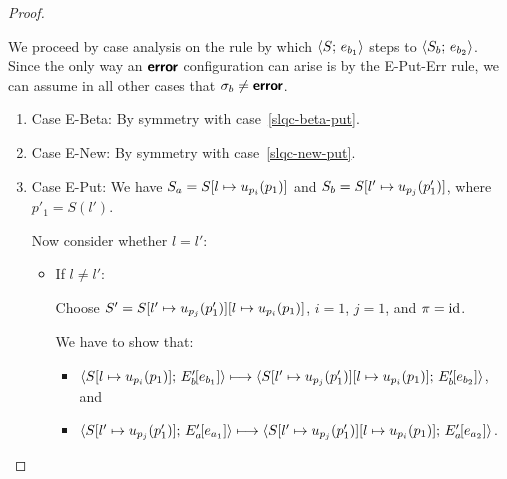 \begin{proof}
\begin{enumerate}
    We proceed by case analysis on the rule by which
    $\langle S;\, e_{b_1} \rangle$ steps to $\langle S_b;\, e_{b_2} \rangle$.  Since the
    only way an $\textbf{\textsf{error}}$ configuration can arise is by the {\sc
      E-Put-Err} rule, we can assume in all other cases that $\sigma_b
    \neq \textbf{\textsf{error}}$.
    \begin{enumerate}
    \item \label{slqc-put-beta}Case {\sc E-Beta}: By symmetry with case~\ref{slqc-beta-put}.
    \item \label{slqc-put-new}Case {\sc E-New}: By symmetry with case~\ref{slqc-new-put}.
    \item \label{slqc-put-put}Case {\sc E-Put}: We have $S_a =
      S[l \mapsto u_{p_i}(p_1)]$ and $S_b =
      S[l' \mapsto u_{p_j}(p'_1)]$, where $p'_1 = S(l')$.

      Now consider whether $l = l'$:
      \begin{itemize}
        \item If $l \neq l'$:

          Choose $S' =
          S[l' \mapsto u_{p_j}(p'_1)][l \mapsto u_{p_i}(p_1)]$,
          $i = 1$, $j = 1$, and $\pi = \mathrm{id}$.

          We have to show that:
          \begin{itemize}
          \item
            $\langle S[l \mapsto u_{p_i}(p_1)];\, E'_b\hspace{-1mm}\left[e_{b_1}\right] \rangle
            \longmapsto
            \langle S[l' \mapsto u_{p_j}(p'_1)][l \mapsto u_{p_i}(p_1)];\, E'_b\hspace{-1mm}\left[e_{b_2}\right] \rangle$,
            and
          \item
            $\langle S[l' \mapsto u_{p_j}(p'_1)];\, E'_a\hspace{-1mm}\left[e_{a_1}\right] \rangle
            \longmapsto
            \langle S[l' \mapsto u_{p_j}(p'_1)][l \mapsto u_{p_i}(p_1)];\, E'_a\hspace{-1mm}\left[e_{a_2}\right] \rangle$.
          \end{itemize}


\end{itemize}
\end{enumerate}
\end{enumerate}
\end{proof}
